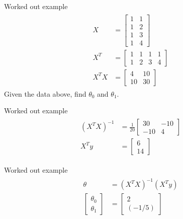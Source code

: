 \documentclass{beamer}
\begin{document}
\begin{frame}{Worked out example}
\begin{align}
\begin{split}
X &= \begin{bmatrix}
1 & 1\\
1 & 2\\
1 & 3 \\
1 & 4
\end{bmatrix}\\
X^{T} &= \begin{bmatrix}
1&1&1&1\\
1&2&3&4
\end{bmatrix}\\
X^{T}X &= \begin{bmatrix}
4 &10\\10&30
\end{bmatrix}
\end{split}
\end{align}
Given the data above, find $\theta_{0}$ and $\theta_{1}$.
\end{frame}


\begin{frame}{Worked out example}
\begin{align}
\begin{split}
(X^{T}X)^{-1} &= \frac{1}{20} \begin{bmatrix}
30 & -10\\
-10& 4
\end{bmatrix}\\
X^{T}y &= \begin{bmatrix}
6\\
14
\end{bmatrix}
\end{split}
\end{align}
\end{frame}


\begin{frame}{Worked out example}
\begin{align}
\begin{split}
\theta &= (X^{T}X)^{-1}(X^{T}y)\\
\begin{bmatrix}
\theta_{0}\\
\theta_{1}
\end{bmatrix} &= 
\begin{bmatrix}
2\\
(-1/5)
\end{bmatrix} 
\end{split}
\end{align}
\end{frame}
\end{document}
